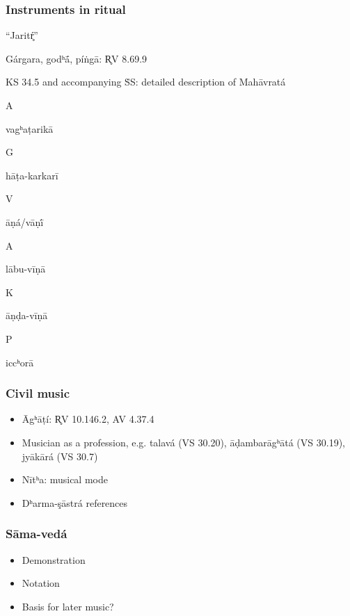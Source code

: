 \documentclass[pdf]{beamer}
\newcommand{\Subitem}[1]{{\setlength\itemindent{12pt} \item[-] #1}}
\begin{document}
\begin{frame} \frametitle{Instruments in ritual}
\begin{itemize}
	\item ``Jaritŕ̥''
	\item Gárgara, godʰā́, píṅgā: R̥V 8.69.9
	\item KS 34.5 and accompanying ṠS: detailed description of Mahāvratá
	\Subitem Avagʰaṭarikā
	\Subitem Ghāṭa-karkarī
	\Subitem Vāṇá/vāṇī́
	\Subitem Alābu-vīṇā
	\Subitem Kāṇḍa-vīṇā
	\Subitem Piccʰorā
\end{itemize}
\end{frame}

\begin{frame} \frametitle{Civil music}
\begin{itemize}
	\item Āgʰāṭí: R̥V 10.146.2, AV 4.37.4
	\item Musician as a profession, e.g. talavá (VS 30.20), āḍambarāgʰātá (VS 30.19), jyākārá (VS 30.7)
	\item Nītʰa: musical mode
	\item Dʰarma-şāstrá references
\end{itemize}
\end{frame}

\begin{frame} \frametitle{Sāma-vedá}
\begin{itemize}
	\item Demonstration
	\item Notation
	\item Basis for later music?
\end{itemize}
\end{frame}

\end{document}
